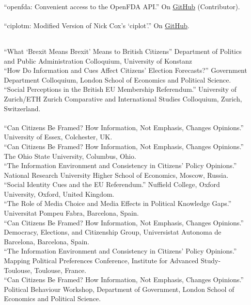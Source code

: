 \documentclass[12pt]{article}
\renewcommand{\section}[1]{\pagebreak[3]%
    \llap{\scshape\smash{\parbox[t]{\marginparwidth}{\raggedright {\color{lg}#1}}}}%
    \vspace{-\baselineskip}\par}
\newcommand{\topic}[1]{\pagebreak[3]\indent {\color{lg}{\footnotesize #1 }}\\}
\newcommand{\entry}[1]{\indent {\color{lg}\guillemotright}\hspace{2pt}#1\vspace{.25em}\\}
\begin{document}
    \topic{R packages contributed to the rOpenHealth project}
	\entry{``openfda: Convenient access to the OpenFDA API.'' On \href{https://github.com/ropenhealth/openfda}{GitHub} (Contributor).}

	\topic{Stata Packages}
	\entry{``ciplotm: Modified Version of Nick Cox's `ciplot'.'' On \href{https://github.com/leeper/ciplotm}{GitHub}.}

\section{Invited\\Presentations\\\& Conference\\Papers}
	\topic{Invited Presentations (2017)}
	\entry{``What `Brexit Means Brexit' Means to British Citizens'' Department of Politics and Public Administration Colloquium, University of Konstanz}
    \entry{``How Do Information and Cues Affect Citizens' Election Forecasts?'' Government Department Colloquium, London School of Economics and Political Science.}
    \entry{``Social Perceptions in the British EU Membership Referendum.'' University of Zurich/ETH Zurich Comparative and International Studies Colloquium, Zurich, Switzerland.}
	
	\topic{Invited Presentations (2016)}
	\entry{``Can Citizens Be Framed? How Information, Not Emphasis, Changes Opinions.'' University of Essex, Colchester, UK.}
	\entry{``Can Citizens Be Framed? How Information, Not Emphasis, Changes Opinions.'' The Ohio State University, Columbus, Ohio.}
	\entry{``The Information Environment and Consistency in Citizens' Policy Opinions.'' National Research University Higher School of Economics, Moscow, Russia.}
	\entry{``Social Identity Cues and the EU Referendum.'' Nuffield College, Oxford University, Oxford, United Kingdom.}
	\entry{``The Role of Media Choice and Media Effects in Political Knowledge Gaps.'' Universitat Pompeu Fabra, Barcelona, Spain.}
	\entry{``Can Citizens Be Framed? How Information, Not Emphasis, Changes Opinions.'' Democracy, Elections, and Citizenship Group, Universistat Autonoma de Barcelona, Barcelona, Spain.}
	\entry{``The Information Environment and Consistency in Citizens' Policy Opinions.'' Mapping Political Preferences Conference, Institute for Advanced Study-Toulouse, Toulouse, France.}
	\entry{``Can Citizens Be Framed? How Information, Not Emphasis, Changes Opinions.'' Political Behaviour Workshop, Department of Government, London School of Economics and Political Science.}
\end{document}
